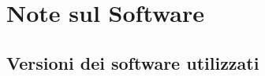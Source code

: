 
\chapter{Note sul Software}
\label{a:notesoftware}

\section{Versioni dei software utilizzati}
\label{s:versionisw}